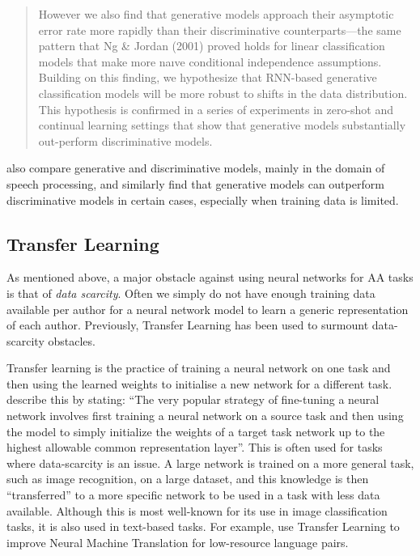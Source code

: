 \begin{quote}
    However we also find that generative models approach their asymptotic error rate more rapidly than their discriminative counterparts—the same pattern that Ng \& Jordan (2001) proved holds for linear classification models that make more naıve conditional independence assumptions.  Building on this finding, we hypothesize that RNN-based generative classification models will be more robust to shifts in the data distribution.  This hypothesis is confirmed in a series of experiments in zero-shot and continual learning settings that show that generative models substantially out-perform discriminative models.
\end{quote}

\citet{deng2015deep} also compare generative and discriminative models, mainly in the domain of speech processing, and similarly find that generative models can outperform discriminative models in certain cases, especially when training data is limited.


\subsection{Transfer Learning}\label{background:style}
\label{transfer-learning-and-style-transfer}
As mentioned above, a major obstacle against using neural networks for AA tasks is that of \textit{data scarcity}. Often we simply do not have enough training data available per author for a neural network model to learn a generic representation of each author. Previously, Transfer Learning has been used to surmount data-scarcity obstacles. 

Transfer learning is the practice of training a neural network on one task and then using the learned weights to initialise a new network for a different task. \citet{riemer2017representation} describe this by stating: ``The very popular strategy of fine-tuning a neural network involves first training a neural network on a source task and then using the model to simply initialize the weights of a target task network up to the highest allowable common representation layer''. This is often used for tasks where data-scarcity is an issue. A large network is trained on a more general task, such as image recognition, on a large dataset, and this knowledge is then ``transferred'' to a more specific network to be used in a task with less data available. Although this is most well-known for its use in image classification tasks, it is also used in text-based tasks. For example, \citet{zoph2016transfer} use Transfer Learning to improve Neural  Machine Translation for low-resource language pairs.


